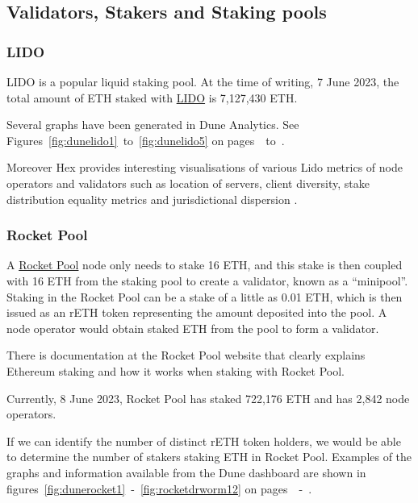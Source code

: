 \documentclass[UTF8]{article}
\begin{document}
\subsection{Validators, Stakers and Staking pools}
\label{sec:stakers}

\subsubsection*{LIDO}
LIDO is a popular liquid staking pool. 
At the time of writing, 7 June 2023, the total amount of ETH staked with \href{https://lido.fi/ethereum}{LIDO}  is 7,127,430 ETH. 

Several graphs have been generated in Dune Analytics. See Figures~\ref{fig:dunelido1}~to~\ref{fig:dunelido5} on pages~\pageref{fig:dunelido1}~to~\pageref{fig:dunelido5}.

Moreover Hex provides interesting visualisations of various Lido metrics of node operators and validators such as location of servers, client diversity, stake distribution equality metrics
 and jurisdictional dispersion \cite{lidodoc}. 

\subsubsection*{Rocket Pool}
A \href{https://rocketpool.net/}{Rocket Pool} node only needs to stake 16 ETH, and this stake is then coupled with 16 ETH from the staking pool to create a validator, known as a ``minipool''.  Staking in the Rocket Pool can be a stake of a little as 0.01 ETH, which is then issued as an rETH token representing the amount deposited into the pool. A node operator would obtain staked ETH from the pool to form a validator.

There is documentation at the Rocket Pool website that clearly explains Ethereum staking and how it works when staking with Rocket Pool.

Currently, 8 June 2023, Rocket Pool has staked 722,176 ETH and has 2,842 node operators.

If we can identify the number of distinct rETH token holders, we would be able to determine the number of stakers staking ETH in Rocket Pool. 
Examples of the graphs and information available from the Dune dashboard are shown in figures~\ref{fig:dunerocket1}~-~\ref{fig:rocketdrworm12} on pages~\pageref{fig:dunerocket1}~-~\pageref{fig:rocketdrworm12}.
\end{document}
